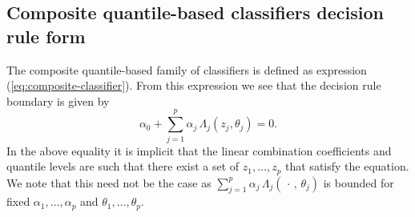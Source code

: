 \subsection{Composite quantile-based classifiers decision rule form}
\label{sec:classifier-discussion}

The composite quantile-based family of classifiers is defined as expression
(\ref{eq:composite-classifier}).  From this expression we see that the decision
rule boundary is given by
\begin{equation}
  \label{eq:composite-classifiers-boundary}
  \alpha_0 + \sum_{j=1}^p \alpha_j\, \Lambda_j (z_j, \theta_j) = 0.
\end{equation}
In the above equality it is implicit that the linear combination coefficients
and quantile levels are such that there exist a set of $z_1, \dots, z_p$ that
satisfy the equation.  We note that this need not be the case as
$\sum_{j=1}^p \alpha_j\, \Lambda_j (\,\cdot\,, \,\theta_j)$ is bounded for fixed
$\alpha_1, \dots, \alpha_p$ and $\theta_1, \dots, \theta_p$.

